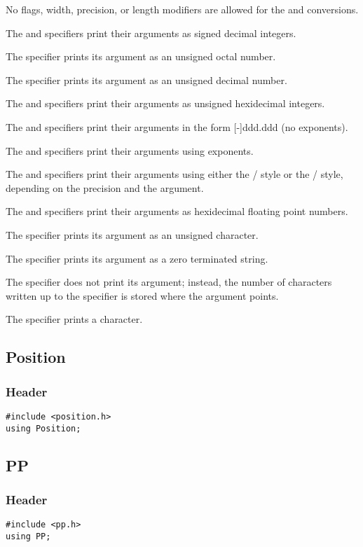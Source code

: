 No flags, width, precision, or length modifiers are allowed for the
 and \code{\%} conversions.

The  and  specifiers print their arguments as signed
decimal integers.

The  specifier prints its argument as an unsigned octal number.

The  specifier prints its argument as an unsigned decimal number.

The  and  specifiers print their arguments as unsigned
hexidecimal integers.

The  and  specifiers print their arguments in the form
[-]ddd.ddd (no exponents).

The  and  specifiers print their arguments using exponents.

The  and  specifiers print their arguments using either
the /
style or the / style, depending on the precision and the
argument.

The  and  specifiers print their arguments as
hexidecimal floating point numbers.

The  specifier prints its argument as an unsigned character.

The  specifier prints its argument as a zero terminated string.

The  specifier does not print its argument; instead, the number
of characters written up to the  specifier is stored where the
argument points.

The \code{\%} specifier prints a \code{\%} character.


\subsection{Position}

\subsubsection*{Header}
\begin{verbatim}
#include <position.h>
using Position;
\end{verbatim}

\subsection{PP}

\subsubsection*{Header}
\begin{verbatim}
#include <pp.h>
using PP;
\end{verbatim}

